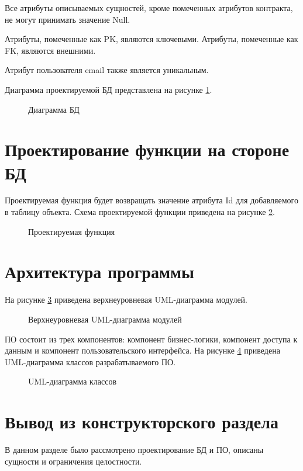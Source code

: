 Все атрибуты описываемых сущностей, кроме помеченных атрибутов контракта, не могут принимать значение Null.

Атрибуты, помеченные как PK, являются ключевыми. Атрибуты, помеченные как FK, являются внешними.

Атрибут пользователя email также является уникальным.

Диаграмма проектируемой БД представлена на рисунке \ref{db_diagram}.
\begin{figure}[h!]
	\center{}
	\caption{Диаграмма БД}
	\label{db_diagram}
\end{figure}

\section{Проектирование функции на стороне БД}
Проектируемая функция будет возвращать значение атрибута Id для добавляемого в таблицу объекта.
Схема проектируемой функции приведена на рисунке \ref{function}.
\begin{figure}[h!]
	\center{}
	\caption{Проектируемая функция}
	\label{function}
\end{figure}

\section{Архитектура программы}
На рисунке \ref{up_level} приведена верхнеуровневая UML-диаграмма модулей.
\begin{figure}[h!]
	\center{}
	\caption{Верхнеуровневая UML-диаграмма модулей}
	\label{up_level}
\end{figure}
ПО состоит из трех компонентов: компонент бизнес-логики, компонент доступа к данным и компонент пользовательского интерфейса.
\newpage
На рисунке \ref{uml} приведена UML-диаграмма классов разрабатываемого ПО.
\begin{figure}[h!]
	\center{}
	\caption{UML-диаграмма классов}
	\label{uml}
\end{figure}


\section{Вывод из конструкторского раздела}
В данном разделе было рассмотрено проектирование БД и ПО, описаны сущности и ограничения целостности.